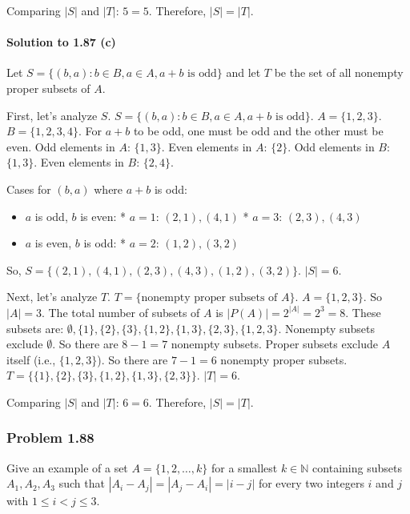 \documentclass{article}
\begin{document}
\begin{itemize}
\begin{itemize}
Comparing $|S|$ and $|T|$: $5 = 5$.
Therefore, $|S| = |T|$.

\paragraph*{Solution to 1.87 (c)}
Let $S = \{(b, a) : b \in B, a \in A, a+b \text{ is odd}\}$ and let $T$ be the set of all nonempty proper subsets of $A$.

First, let's analyze $S$. $S = \{(b, a) : b \in B, a \in A, a+b \text{ is odd}\}$.
$A = \{1, 2, 3\}$.
$B = \{1, 2, 3, 4\}$.
For $a+b$ to be odd, one must be odd and the other must be even.
Odd elements in $A$: $\{1, 3\}$. Even elements in $A$: $\{2\}$.
Odd elements in $B$: $\{1, 3\}$. Even elements in $B$: $\{2, 4\}$.

Cases for $(b, a)$ where $a+b$ is odd:
\begin{itemize}
    \item $a$ is odd, $b$ is even:
        *   $a=1$: $(2,1), (4,1)$
        *   $a=3$: $(2,3), (4,3)$
    \item $a$ is even, $b$ is odd:
        *   $a=2$: $(1,2), (3,2)$
\end{itemize}
So, $S = \{(2,1), (4,1), (2,3), (4,3), (1,2), (3,2)\}$.
$|S| = 6$.

Next, let's analyze $T$. $T = \{\text{nonempty proper subsets of } A\}$.
$A = \{1, 2, 3\}$. So $|A| = 3$.
The total number of subsets of $A$ is $|P(A)| = 2^{|A|} = 2^3 = 8$.
These subsets are: $\emptyset, \{1\}, \{2\}, \{3\}, \{1,2\}, \{1,3\}, \{2,3\}, \{1,2,3\}$.
Nonempty subsets exclude $\emptyset$. So there are $8-1=7$ nonempty subsets.
Proper subsets exclude $A$ itself (i.e., $\{1,2,3\}$). So there are $7-1=6$ nonempty proper subsets.
$T = \{\{1\}, \{2\}, \{3\}, \{1,2\}, \{1,3\}, \{2,3\}\}$.
$|T| = 6$.

Comparing $|S|$ and $|T|$: $6 = 6$.
Therefore, $|S| = |T|$.

\subsubsection*{Problem 1.88}
Give an example of a set $A = \{1, 2, \dots, k\}$ for a smallest $k \in \mathbb{N}$ containing subsets $A_1, A_2, A_3$ such that $|A_i - A_j| = |A_j - A_i| = |i - j|$ for every two integers $i$ and $j$ with $1 \le i < j \le 3$.


\end{itemize}
\end{itemize}
\end{document}
